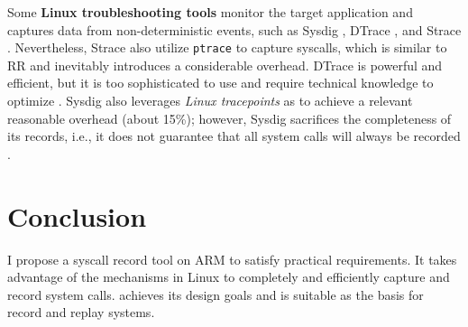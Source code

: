 Some \textbf{Linux troubleshooting tools} monitor the target application and captures data
from non-deterministic events, such as Sysdig \cite{github_sysdig_2021}, DTrace
\cite{gregg_dtrace_2019,gregg_dtrace_2011}, and Strace \cite{github_strace_2021}.
Nevertheless, Strace \cite{github_strace_2021} also utilize \texttt{ptrace} to capture syscalls, which is similar to RR and inevitably introduces a considerable overhead. DTrace is powerful and efficient, but it is too sophisticated to use and require technical knowledge to optimize \cite{gregg_dtrace_2011}. Sysdig also leverages \textit{Linux tracepoints} as \TheName to achieve a relevant reasonable overhead (about 15\%); however, Sysdig sacrifices the completeness of its records, i.e., it does not guarantee that all system calls will always be recorded \cite{degioanni_sysdig_2014}.




\section{Conclusion}

I propose a syscall record tool \TheName on ARM to satisfy practical requirements. It takes advantage of the mechanisms in Linux to completely and efficiently capture and record system calls. \TheName achieves its design goals and is suitable as the basis for record and replay systems. 